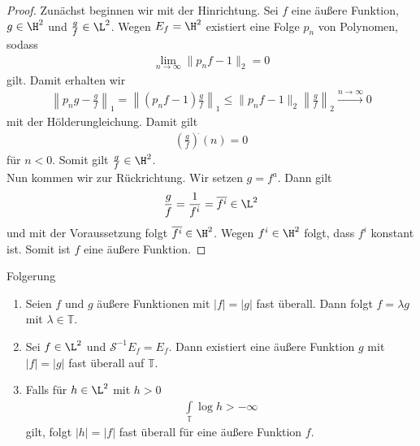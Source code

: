 \begin{proof}
	Zunächst beginnen wir mit der Hinrichtung.
	Sei $ f $ eine äußere Funktion, $ g \in \H^2$ und $ \frac{g}{f} \in \L^2 $. Wegen $ E_f = \H^2 $ existiert eine Folge $ p_n $ von Polynomen, sodass
	\begin{align*}
	\lim\limits_{n \to \infty} \| p_n f - 1 \|_2 = 0
	\end{align*}
	gilt. Damit erhalten wir 
	\begin{align*}
	\left\| p_n g - \frac{g}{f} \right\|_1 
	= 
	\left\| (p_n f - 1 ) \frac{g}{f} \right\|_1 
	\leq
	\| p_n f - 1 \|_2 \left\| \frac{g}{f} \right\|_2
	\stackrel{n \to \infty}{\rightarrow} 0
	\end{align*}
	mit der Hölderungleichung. Damit gilt
	\begin{align*}
	\left(\frac{g}{f}\right)^{\hat{}}(n) = 0
	\end{align*}
	für $ n <0 $. Somit gilt $ \frac{g}{f} \in \H^2$.\\
	Nun kommen wir zur Rückrichtung.
	Wir setzen $ g = f^a $.
	Dann gilt
	\begin{align*}
	\frac{g}{f} = \frac{1}{f^i} = \overline{f^i} \in \L^2
	\end{align*}
	und mit der Voraussetzung folgt $ \overline{f^i} \in \H^2 $.
	Wegen $ f^i \in \H^2 $ folgt, dass $ f^i $ konstant ist.
	Somit ist $ f $ eine äußere Funktion.
\end{proof}

\begin{genericthm}{Folgerung}\label{skript:2.4}
	\begin{enumerate}[label=\text{\textbf{(\arabic*)}}]
		\item
		Seien $ f$ und $g $ äußere Funktionen mit $ |f| = |g| $ fast überall.
		Dann folgt $ f = \lambda g $ mit $ \lambda \in \mathbb{T} $.
		
		\item Sei $ f \in \L^2 $ und $ \mathscr{S}^{-1} E_f =  E_f$.
		Dann existiert eine äußere Funktion $ g $ mit $ |f | = |g|  $ fast überall auf $ \mathbb{T} $.
		
		\item
		Falls für $ h \in \L^2 $ mit $ h >0 $ 
		\begin{align*}
		\int \limits_{\mathbb{T} } \log h > - \infty
		\end{align*}
		gilt, folgt $ |h| = |f| $ fast überall für eine äußere Funktion $ f $.
	\end{enumerate}
\end{genericthm}

